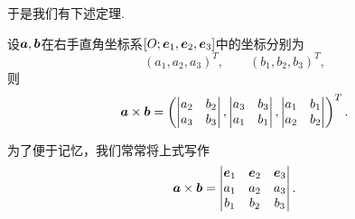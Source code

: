 于是我们有下述定理.
\begin{theorem}
设\(\boldsymbol{a},\boldsymbol{b}\)在右手直角坐标系\([O;\boldsymbol{e}_1,\boldsymbol{e}_2,\boldsymbol{e}_3]\)中的坐标分别为\begin{equation*}
	(a_1,a_2,a_3)^T, \qquad
	(b_1,b_2,b_3)^T,
\end{equation*}
则
\begin{equation}
	\boldsymbol{a}\times\boldsymbol{b}
	= \left( \begin{vmatrix}
		a_2 & b_2 \\
		a_3 & b_3 \\
	\end{vmatrix},
	\begin{vmatrix}
		a_3 & b_3 \\
		a_1 & b_1 \\
	\end{vmatrix},
	\begin{vmatrix}
		a_1 & b_1 \\
		a_2 & b_2 \\
	\end{vmatrix} \right)^T.
\end{equation}
\end{theorem}
为了便于记忆，我们常常将上式写作\begin{equation}
	\boldsymbol{a}\times\boldsymbol{b}
	= \begin{vmatrix}
		\boldsymbol{e}_1 & \boldsymbol{e}_2 & \boldsymbol{e}_3 \\
		a_1 & a_2 & a_3 \\
		b_1 & b_2 & b_3
	\end{vmatrix}.
\end{equation}

